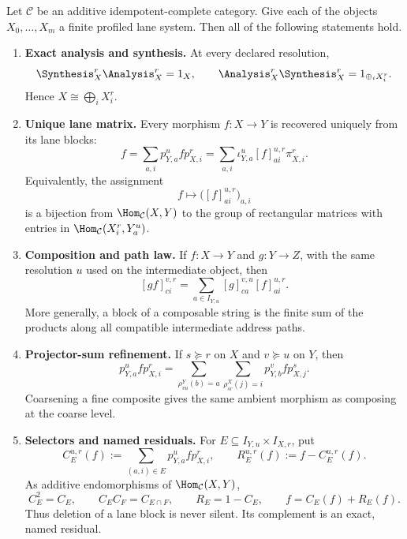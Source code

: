 \begin{theorem}
\label{thm:block15-universal-lane-transport}
Let \(\mathcal C\) be an additive idempotent-complete category.  Give each of
the objects \(X_0,\ldots,X_m\) a finite profiled lane system.  Then all of the
following statements hold.

\begin{enumerate}[label=\textup{(L\arabic*)}]
\item \textbf{Exact analysis and synthesis.}  At every declared resolution,
\[
 \Synthesis_X^r\Analysis_X^r=1_X,
 \qquad
 \Analysis_X^r\Synthesis_X^r
 =1_{\oplus_iX_i^r}.
\]
Hence \(X\cong\bigoplus_iX_i^r\).

\item \textbf{Unique lane matrix.}  Every morphism \(f:X\to Y\) is recovered
uniquely from its lane blocks:
\[
 f
 =
 \sum_{a,i}p_{Y,a}^u f p_{X,i}^r
 =
 \sum_{a,i}\iota_{Y,a}^u
 [f]^{u,r}_{a i}\pi_{X,i}^r.
\]
Equivalently, the assignment
\[
 f\longmapsto
 \bigl([f]^{u,r}_{a i}\bigr)_{a,i}
\]
is a bijection from \(\Hom_{\mathcal C}(X,Y)\) to the group of rectangular
matrices with entries in
\(\Hom_{\mathcal C}(X_i^r,Y_a^u)\).

\item \textbf{Composition and path law.}  If \(f:X\to Y\) and \(g:Y\to Z\),
with the same resolution \(u\) used on the intermediate object, then
\[
 [gf]^{v,r}_{c i}
 =
 \sum_{a\in I_{Y,u}}[g]^{v,u}_{c a}[f]^{u,r}_{a i}.
\]
More generally, a block of a composable string is the finite sum of the
products along all compatible intermediate address paths.

\item \textbf{Projector-sum refinement.}  If \(s\succeq r\) on \(X\) and
\(v\succeq u\) on \(Y\), then
\[
 p_{Y,a}^u f p_{X,i}^r
 =
 \sum_{\rho^Y_{vu}(b)=a}
 \sum_{\rho^X_{sr}(j)=i}
 p_{Y,b}^v f p_{X,j}^s.
\]
Coarsening a fine composite gives the same ambient morphism as composing at
the coarse level.

\item \textbf{Selectors and named residuals.}  For
\(E\subseteq I_{Y,u}\times I_{X,r}\), put
\[
 C_E^{u,r}(f)
 :=\sum_{(a,i)\in E}p_{Y,a}^ufp_{X,i}^r,
 \qquad
 R_E^{u,r}(f):=f-C_E^{u,r}(f).
\]
As additive endomorphisms of \(\Hom_{\mathcal C}(X,Y)\),
\[
 C_E^2=C_E,
 \qquad
 C_EC_F=C_{E\cap F},
 \qquad
 R_E=1-C_E,
 \qquad
 f=C_E(f)+R_E(f).
\]
Thus deletion of a lane block is never silent.  Its complement is an exact,
named residual.


\end{enumerate}
\end{theorem}

